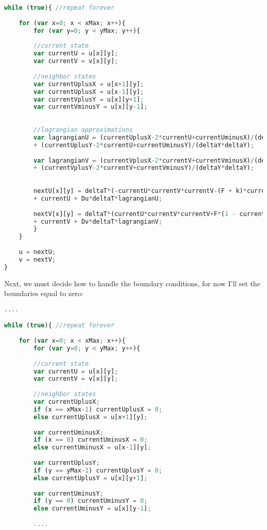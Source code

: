 {\begin{lstlisting}[language=JavaScript]
while (true){ //repeat forever
	
    for (var x=0; x < xMax; x++){
    	for (var y=0; y < yMax; y++){
    	
	    //current state
	    var currentU = u[x][y];
	    var currentV = v[x][y];
		
	    //neighbor states
	    var currentUplusX = u[x+1][y];
	    var currentUplusX = u[x-1][y];
	    var currentVplusY = u[x][y+1];
	    var currentVminusY = u[x][y-1];
		
		
	    //lagrangian approximations
	    var lagrangianU = (currentUplusX-2*currentU+currentUminusX)/(deltaX*deltaX) 
		+ (currentUplusY-2*currentU+currentUminusY)/(deltaY*deltaY); 
			
	    var lagrangianV = (currentVplusX-2*currentV+currentVminusX)/(deltaX*deltaX)
		+ (currentVplusY-2*currentV+currentVminusY)/(deltaY*deltaY); 
		
		
	    nextU[x][y] = deltaT*(-currentU*currentV*currentV-(F + k)*currentV) 
		+ currentU + Du*deltaT*lagrangianU;
			
	    nextV[x][y] = deltaT*(currentU*currentV*currentV+F*(1 - currentU)) 
		+ currentV + Dv*deltaT*lagrangianV;
    	}
    }
    
    u = nextU;
    v = nextV;
}
\end{lstlisting}


Next, we must decide how to handle the boundary conditions, for now I'll set the boundaries equal to zero:

\begin{lstlisting}[language=JavaScript]
....

while (true){ //repeat forever
	
    for (var x=0; x < xMax; x++){
    	for (var y=0; y < yMax; y++){
    	
	    //current state
	    var currentU = u[x][y];
	    var currentV = v[x][y];
		
	    //neighbor states
	    var currentUplusX;
	    if (x == xMax-1) currentUplusX = 0;
	    else currentUplusX = u[x+1][y];
	    
	    var currentUminusX;
	    if (x == 0) currentUminusX = 0;
	    else currentUminusX = u[x-1][y];
	    
	    var currentUplusY;
	    if (y == yMax-1) currentUplusY = 0;
	    else currentUplusY = u[x][y+1];
	    
	    var currentUminusY;
	    if (y == 0) currentUminusY = 0;
	    else currentUminusY = u[x][y-1];
		
	    ....
	

\end{lstlisting}}
